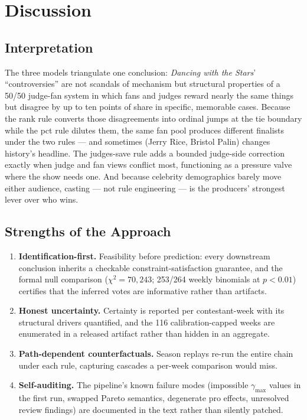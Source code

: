 \documentclass[11pt]{article}
\begin{document}
\section{Discussion}
\label{sec:discussion}

\subsection{Interpretation}

The three models triangulate one conclusion: \textit{Dancing with the Stars}'
``controversies'' are not scandals of mechanism but structural properties of a 50/50
judge-fan system in which fans and judges reward nearly the same things but disagree by
up to ten points of share in specific, memorable cases. Because the rank rule converts
those disagreements into ordinal jumps at the tie boundary while the pct rule dilutes
them, the same fan pool produces different finalists under the two rules --- and
sometimes (Jerry Rice, Bristol Palin) changes history's headline. The judges-save rule
adds a bounded judge-side correction exactly when judge and fan views conflict most,
functioning as a pressure valve where the show needs one. And because celebrity
demographics barely move either audience, casting --- not rule engineering --- is the
producers' strongest lever over who wins.

\subsection{Strengths of the Approach}

\begin{enumerate}[itemsep=1pt]
  \item \textbf{Identification-first.} Feasibility before prediction: every downstream
        conclusion inherits a checkable constraint-satisfaction guarantee, and the
        formal null comparison ($\chi^2 = 70{,}243$; 253/264 weekly binomials at
        $p<0.01$) certifies that the inferred votes are informative rather than
        artifacts.
  \item \textbf{Honest uncertainty.} Certainty is reported per contestant-week with its
        structural drivers quantified, and the 116 calibration-capped weeks are
        enumerated in a released artifact rather than hidden in an aggregate.
  \item \textbf{Path-dependent counterfactuals.} Season replays re-run the entire chain
        under each rule, capturing cascades a per-week comparison would miss.
  \item \textbf{Self-auditing.} The pipeline's known failure modes (impossible
        $\gamma_{\max}$ values in the first run, swapped Pareto semantics, degenerate
        pro effects, unresolved review findings) are documented in the text rather than
        silently patched.
\end{enumerate}
\end{document}
